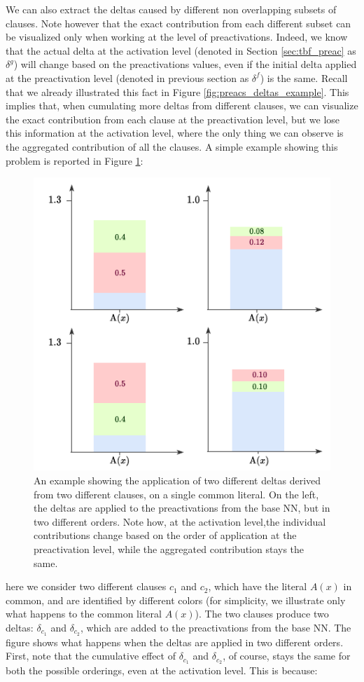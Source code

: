 We can also extract the deltas caused by different non overlapping subsets of clauses. Note however that the exact contribution from each different subset can be visualized only when working at the level of preactivations. Indeed, we know that the actual delta at the activation level (denoted in Section \ref{sec:tbf_preac} as $\delta^g$) will change based on the preactivations values, even if the initial delta applied at the preactivation level (denoted in previous section as $\delta^f$) is the same. Recall that we already illustrated this fact in Figure \ref{fig:preacs_deltas_example}. This implies that, when cumulating more deltas from different clauses, we can visualize the exact contribution from each clause at the preactivation level, but we lose this information at the activation level, where the only thing we can observe is the aggregated contribution of all the clauses. A simple example showing this problem is reported in Figure \ref{fig:ex_more_clauses}: 
 \begin{figure}
	\centering
	\includegraphics[width=0.5\linewidth]{figures/example_more_clauses.pdf}
	\caption{An example showing the application of two different deltas derived from two different clauses, on a single common literal. On the left, the deltas are applied to the preactivations from the base NN, but in two different orders. Note how, at the activation level,the individual contributions change based on the order of application at the preactivation level,  while the aggregated contribution stays the same.}
	\label{fig:ex_more_clauses}
\end{figure}
here we consider two different clauses $c_1$ and $c_2$, which have the literal $A(x)$ in common, and are identified by different colors (for simplicity, we illustrate only what happens to the common literal $A(x)$). The two clauses produce two deltas: $\delta_{c_1}$ and $\delta_{c_2}$, which are added to the preactivations from the base NN. The figure shows what happens when the deltas are applied in two different orders. First, note that the cumulative effect of $\delta_{c_1}$ and $\delta_{c_2}$, of course, stays the same for both the possible orderings, even at the activation level. This is because:
